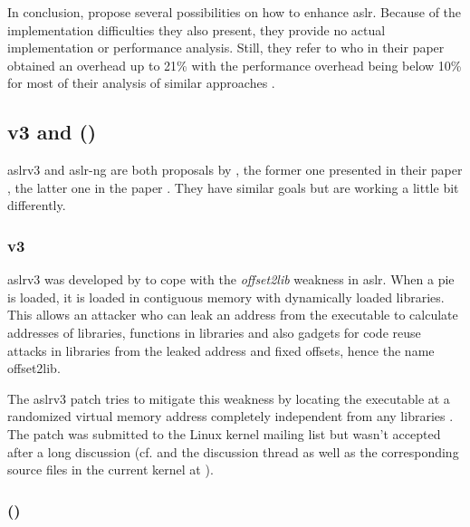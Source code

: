 \bigskip\noindent
In conclusion, \citeauthor{Shacham2004} propose several possibilities on how to enhance \gls{aslr}.
Because of the implementation difficulties they also present, they provide no actual implementation or performance analysis.
Still, they refer to \cite{Bhatkar2003} who in their paper  obtained an overhead up to 21\% with the performance overhead being below 10\% for most of their analysis of similar approaches \cite[117]{Bhatkar2003}.

\subsection{v3 and  ()}
\label{subsec:aslrv3-aslr-ng}

\acs{aslr}v3 and \gls{aslr-ng} are both proposals by \citeauthor{MarcoGisbert2014}, the former one presented in their \citeyear{MarcoGisbert2014} paper , the latter one in the \citeyear{MarcoGisbert2016} paper .
They have similar goals but are working a little bit differently.

\subsubsection{v3}
\label{subsubsec:aslrv3}

\acs{aslr}v3 was developed by \citeauthor{MarcoGisbert2014} to cope with the \emph{offset2lib} weakness in \gls{aslr}.
When a \gls{pie} is loaded, it is loaded in contiguous memory with dynamically loaded libraries.
This allows an attacker who can leak an address from the executable to calculate addresses of libraries, functions in libraries and also gadgets for code reuse attacks in libraries from the leaked address and fixed offsets, hence the name offset2lib.

The \acs{aslr}v3 patch tries to mitigate this weakness by locating the executable at a randomized virtual memory address completely independent from any libraries \cite{MarcoGisbert2014}.
The patch was submitted to the Linux kernel mailing list but wasn't accepted after a long discussion (cf. \cite{MarcoGisbert2014a} and the discussion thread as well as the corresponding source files in the current kernel at \cite{LKD2020}).

\subsubsection{ ()}
\label{subsubsec:aslr-ng}

